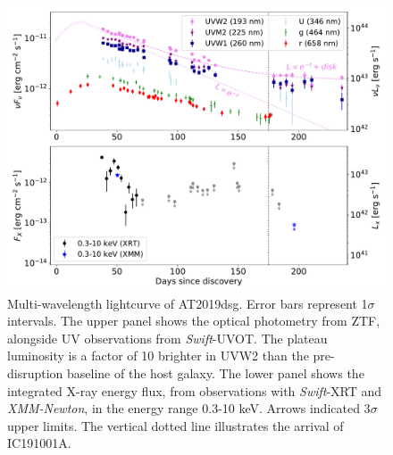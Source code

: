 \documentclass{nature_plusfigure}
\begin{document}


\begin{figure}
\includegraphics[width=\textwidth]{lightcurve_wfit.pdf}
\caption{Multi-wavelength lightcurve of AT2019dsg. Error bars represent 1$\sigma$ intervals. The upper panel shows the optical photometry from ZTF, alongside UV observations from \textit{Swift}-UVOT. The plateau luminosity is a factor of 10 brighter in UVW2 than the pre-disruption baseline of the host galaxy. The lower panel shows the integrated X-ray energy flux, from observations with \textit{Swift}-XRT and \textit{XMM-Newton}, in the energy range 0.3-10 keV. Arrows indicated 3$\sigma$ upper limits.  The vertical dotted line illustrates the arrival of IC191001A.}
\label{fig:lightcurve}
\end{figure}
\newpage
\end{document}
